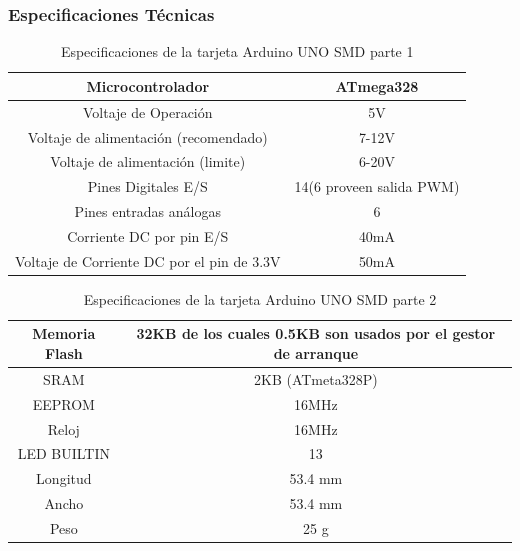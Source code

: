 \documentclass[12pt]{report}
\begin{document}
\subsubsection{Especificaciones Técnicas}
\begin{table}[h]
\caption{Especificaciones de la tarjeta Arduino UNO SMD parte 1}
\begin{center}
\begin{tabular}{|c|c|}
\hline
Microcontrolador & ATmega328\\ \hline
Voltaje de Operación & 5V\\ \hline
Voltaje de alimentación (recomendado) & 7-12V \\ \hline
Voltaje de alimentación (limite) & 6-20V \\ \hline
Pines Digitales E/S	& 14(6 proveen salida PWM) \\ \hline
Pines entradas análogas	& 6 \\ \hline
Corriente DC por pin E/S &  40mA\\ \hline
Voltaje de Corriente DC por el pin de 3.3V & 50mA \\ \hline
\end{tabular}
\end{center}
\end{table}

\begin{table}[h]
\caption{Especificaciones de la tarjeta Arduino UNO SMD parte 2}
\begin{center}
\begin{tabular}{|c|c|}
\hline
Memoria Flash & 32KB de los cuales 0.5KB son usados por el gestor de arranque
\\ \hline
SRAM & 2KB (ATmeta328P)\\ \hline
EEPROM & 16MHz \\ \hline
Reloj & 16MHz \\ \hline
LED BUILTIN	& 13 \\ \hline
Longitud	& 53.4 mm \\ \hline
Ancho & 53.4 mm \\ \hline
Peso & 25 g \\ \hline
\end{tabular}
\end{center}
\end{table}
 
\end{document}
